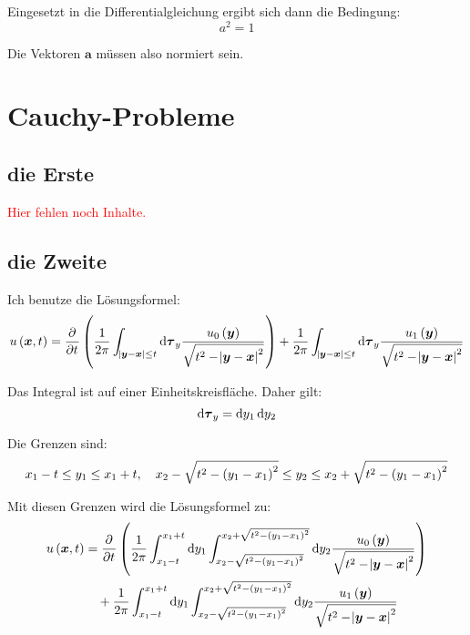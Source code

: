 \documentclass[11pt, ngerman, fleqn]{article}
\newcommand{\fehlt}{\textcolor{red}{Hier fehlen noch Inhalte.}}
\renewcommand{\vec}[1]{\boldsymbol{#1}}
\begin{document}
Eingesetzt in die Differentialgleichung ergibt sich dann die Bedingung:
\[
	a^2 = 1
\]

Die Vektoren $\vec a$ müssen also normiert sein.


\section{Cauchy-Probleme}
\label{3}

\subsection{die Erste}

\fehlt

\subsection{die Zweite}

Ich benutze die Lösungsformel:
\[
	u\del{\vec x, t} = \dpd{}t \del{
		\frac{1}{2 \pi} \int_{\abs{\vec y - \vec x} \leq t} \dif \vec \tau_y \frac{u_0\del{\vec y}}{\sqrt{t^2 - \abs{\vec y - \vec x}^2}}
	}
	+
	\frac{1}{2 \pi} \int_{\abs{\vec y - \vec x} \leq t} \dif \vec \tau_y \frac{u_1\del{\vec y}}{\sqrt{t^2 - \abs{\vec y - \vec x}^2}}
\]

Das Integral ist auf einer Einheitskreisfläche. Daher gilt:
\[
	\dif \vec \tau_y = \dif y_1 \dif y_2
\]

Die Grenzen sind:
\[
	x_1 - t \leq y_1 \leq x_1 + t
	,\quad
	x_2 - \sqrt{t^2-\del{y_1 - x_1}^2} \leq y_2 \leq x_2 + \sqrt{t^2-\del{y_1 - x_1}^2}
\]

Mit diesen Grenzen wird die Lösungsformel zu:
\begin{align*}
	u\del{\vec x, t} &= \dpd{}t \del{
		\frac{1}{2 \pi}
		\int_{x_1 - t}^{x_1 + t} \dif y_1
		\int_{x_2 - \sqrt{t^2-\del{y_1 - x_1}^2}}^{x_2 + \sqrt{t^2-\del{y_1 - x_1}^2}} \dif y_2
		\frac{u_0\del{\vec y}}{\sqrt{t^2 - \abs{\vec y - \vec x}^2}}
	} \\
	&\quad+
	\frac{1}{2 \pi}
	\int_{x_1 - t}^{x_1 + t} \dif y_1
	\int_{x_2 - \sqrt{t^2-\del{y_1 - x_1}^2}}^{x_2 + \sqrt{t^2-\del{y_1 - x_1}^2}} \dif y_2
	\frac{u_1\del{\vec y}}{\sqrt{t^2 - \abs{\vec y - \vec x}^2}}
\end{align*}
\end{document}
